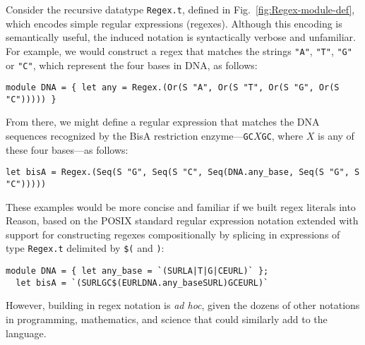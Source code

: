 \documentclass[acmsmall]{acmart}
\newcommand{\li}[1]{\lstinline[basicstyle=\ttfamily\fontsize{9pt}{1em}\selectfont]{#1}}
\theoremstyle{slplain}
\numberwithin{thm}{section}
\begin{document}
Consider the recursive datatype \li{Regex.t}, defined in Fig.~\ref{fig:Regex-module-def}, which encodes simple regular expressions (regexes). Although this encoding is semantically useful, the induced notation is syntactically verbose and unfamiliar. For example, we would construct a regex that matches the strings \li{"A"}, \li{"T"}, \li{"G"} or \li{"C"}, which represent the four bases in DNA, as follows:
\begin{lstlisting}[numbers=none]
  module DNA = { let any = Regex.(Or(S "A", Or(S "T", Or(S "G", Or(S "C"))))) }
\end{lstlisting}
From there, we might define a regular expression that matches the DNA sequences recognized by the BisA restriction enzyme---\li{GC}$X$\li{GC}, where $X$ is any of these four bases---as follows:
\begin{lstlisting}[numbers=none]
  let bisA = Regex.(Seq(S "G", Seq(S "C", Seq(DNA.any_base, Seq(S "G", S "C")))))
\end{lstlisting}

These examples would be more concise and familiar if we built regex literals into Reason, based on the POSIX standard regular expression notation extended with support for constructing regexes compositionally by splicing in expressions of type \li{Regex.t} delimited by \li{$(} and \li{)}:
\begin{lstlisting}[numbers=none]
  module DNA = { let any_base = `(SURLA|T|G|CEURL)` };
  let bisA = `(SURLGC$(EURLDNA.any_baseSURL)GCEURL)`
\end{lstlisting}
\noindent
However, building in regex notation is \emph{ad hoc}, given the dozens of other
notations in programming, mathematics, and science that could similarly
add to the language.
\end{document}
